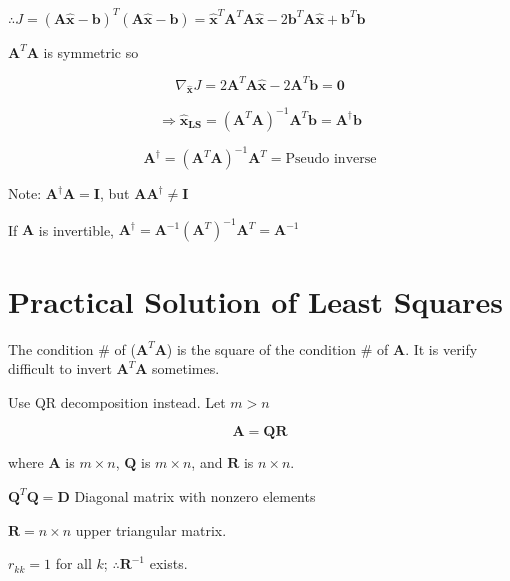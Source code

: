\documentclass[fleqn]{article}
\begin{document}
	$\therefore J = (\mathbf{A\hat{x}} - \mathbf{b})^T(\mathbf{A\hat{x}} - \mathbf{b}) = \mathbf{\hat{x}}^T\mathbf{A}^T\mathbf{A}\mathbf{\hat{x}} - 2\mathbf{b}^T\mathbf{A\hat{x}} + \mathbf{b}^T\mathbf{b}$
	
	$\mathbf{A}^T\mathbf{A}$ is symmetric so
	
	\begin{equation*}
		\nabla_{\mathbf{\hat{x}}}J = 2\mathbf{A}^T\mathbf{A\hat{x}} - 2\mathbf{A}^T\mathbf{b} = \mathbf{0}
	\end{equation*}
	
	\begin{equation*}
		\Rightarrow \mathbf{\hat{x}_{LS}} = (\mathbf{A}^T\mathbf{A})^{-1}\mathbf{A}^T\mathbf{b} = \mathbf{A}^{\dag}\mathbf{b}
	\end{equation*}
	
	\begin{equation*}
		\mathbf{A}^{\dag} = (\mathbf{A}^T\mathbf{A})^{-1}\mathbf{A}^T = \text{Pseudo inverse}
	\end{equation*}
	
	Note: $\mathbf{A}^{\dag}\mathbf{A} = \mathbf{I}$, but $\mathbf{A}\mathbf{A}^{\dag} \neq \mathbf{I}$
	
	If $\mathbf{A}$ is invertible, $\mathbf{A}^{\dag} = \mathbf{A}^{-1}\left(\mathbf{A}^T\right)^{-1}\mathbf{A}^T = \mathbf{A}^{-1}$
	
	\section{Practical Solution of Least Squares}
	
	The condition \# of ($\mathbf{A}^T\mathbf{A}$) is the square of the condition \# of $\mathbf{A}$. It is verify difficult to invert $\mathbf{A}^T\mathbf{A}$ sometimes.
	
	Use QR decomposition instead. Let $m > n$
	
	\begin{equation*}
		\mathbf{A} = \mathbf{Q}\mathbf{R}
	\end{equation*}
	
	where $\mathbf{A}$ is $m \times n$, $\mathbf{Q}$ is $m \times n$, and $\mathbf{R}$ is $n \times n$.
	
	$\mathbf{Q}^T\mathbf{Q} = \mathbf{D}$ Diagonal matrix with nonzero elements
	
	$\mathbf{R} = n \times n$ upper triangular matrix.
	
	$r_{kk} = 1$ for all $k$; $\therefore \mathbf{R}^{-1}$ exists.
	
\end{document}
